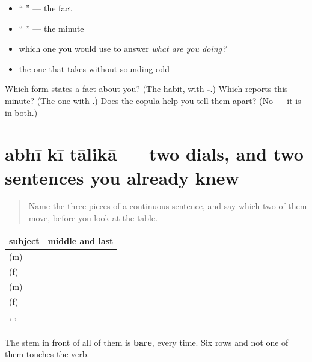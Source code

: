 \begin{itemize}
\raggedright
  \item \textquotedblleft{}   \textquotedblright{} — the fact
  \item \textquotedblleft{}    \textquotedblright{} — the minute
  \item which one you would use to answer \emph{what are you doing?}
  \item the one that takes \textbf{} without sounding odd
\end{itemize}

\begin{tcolorbox}[breakable,colback=teal!4,colframe=teal!35!black,title={Before you move on}]
Which form states a fact about you? (The habit, with \textbf{-}.) Which reports this minute? (The one with \textbf{}.) Does the copula help you tell them apart? (No — it is in both.)
\end{tcolorbox}
\section[\texorpdfstring{\hi{अभी} \hi{की} \hi{तालिका} (abhī kī tālikā)}{अभी की तालिका (abhī kī tālikā)}]{abhī kī tālikā — two dials, and two sentences you already knew}

\label{lesson:HI-C89-repaso-jaari}



\begin{quote}
Name the three pieces of a continuous sentence, and say which two of them move, before you look at the table.
\end{quote}

\begin{grammarlens}[title={Grammar Lens: the grid}]
\noindent
\begin{tabularx}{\linewidth}{@{}>{\raggedright\arraybackslash}X>{\raggedright\arraybackslash}X@{}}
\toprule
\textbf{subject} & \textbf{middle and last} \\
\midrule
\hi{मैं} (m) & \hi{रहा} \hi{हूँ} \\
\hi{मैं} (f) & \hi{रही} \hi{हूँ} \\
\hi{वह} (m) & \hi{रहा} \hi{है} \\
\hi{वह} (f) & \hi{रही} \hi{है} \\
\hi{हम}, \hi{वे}, \hi{आप} & \hi{रहे} \hi{हैं} \\
\hi{तुम} & \hi{रहे} \hi{हो} \\
\bottomrule
\end{tabularx}

The stem in front of all of them is \textbf{bare}, every time. Six rows and not one of them touches the verb.
\end{grammarlens}

